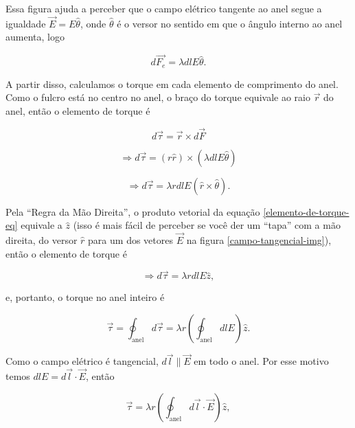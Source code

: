 \documentclass[
	article,
	11pt,
	oneside,
	a4paper,
	english,
	brazil,
	sumario=tradicional
	]{abntex2}
\begin{document}
Essa figura ajuda a perceber que o campo elétrico tangente ao anel segue a igualdade $\vec{E} = E \hat{\theta}$, onde $\hat{\theta}$ é o versor no sentido em que o ângulo interno ao anel aumenta, logo

\begin{equation}
    d \vec{F_e} =  \lambda dl E \hat{\theta}.
\end{equation}

A partir disso, calculamos o torque em cada elemento de comprimento do anel. Como o fulcro está no centro no anel, o braço do torque equivale ao raio $\vec{r}$ do anel, então o elemento de torque é

\begin{equation}
    d \vec{\tau} = \vec{r} \times d\vec{F}
\end{equation}

\begin{equation}
    \Rightarrow d \vec{\tau} = \left(r \hat{r}\right) \times \left(\lambda dl E \hat{\theta}\right)
\end{equation}

\begin{equation} \label{elemento-de-torque-eq}
    \Rightarrow d \vec{\tau} = \lambda r dl E \left(\hat{r} \times \hat{\theta}\right).
\end{equation}

Pela ``Regra da Mão Direita'', o produto vetorial da equação \ref{elemento-de-torque-eq} equivale a $\hat{z}$ (isso é mais fácil de perceber se você der um ``tapa'' com a mão direita, do versor $\hat{r}$ para um dos vetores $\vec{E}$ na figura \ref{campo-tangencial-img}), então o elemento de torque é

\begin{equation}
    \Rightarrow d \vec{\tau} = \lambda r dl E \hat{z},
\end{equation}

\noindent e, portanto, o torque no anel inteiro é

\begin{equation}
    \vec{\tau} = \oint_{\text{anel}} d \vec{\tau} = \lambda r \left(\oint_{\text{anel}} dl E\right) \hat{z}.
\end{equation}

Como o campo elétrico é tangencial, $d\vec{l} \parallel \vec{E}$ em todo o anel. Por esse motivo temos $dl E = d\vec{l} \cdot \vec{E} $, então

\begin{equation}
    \vec{\tau} = \lambda r \left(\oint_{\text{anel}} d\vec{l} \cdot \vec{E}\right) \hat{z},
\end{equation}
\end{document}
